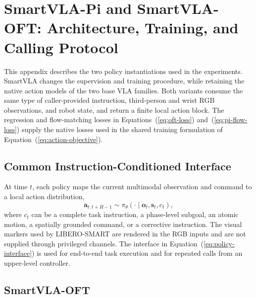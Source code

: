 \section{SmartVLA-Pi and SmartVLA-OFT: Architecture, Training, and Calling Protocol}
\label{appendix:model-details}

This appendix describes the two policy instantiations used in the
experiments. SmartVLA changes the supervision and training procedure,
while retaining the native action models of the two base VLA families.
Both variants consume the same type of caller-provided instruction,
third-person and wrist RGB observations, and robot state, and return a
finite local action block. The regression and flow-matching losses in
Equations~(\ref{eq:oft-loss}) and~(\ref{eq:pi-flow-loss}) supply the native
losses used in the shared training formulation of Equation~(\ref{eq:action-objective}).

\subsection{Common Instruction-Conditioned Interface}

At time $t$, each policy maps the current multimodal observation and
command to a local action distribution,
\begin{equation}
\label{eq:policy-interface}
\mathbf{a}_{t:t+H-1} \sim \pi_\theta(\cdot \mid
  \mathbf{o}_t,\mathbf{s}_t,c_t),
\end{equation}
where $c_t$ can be a complete task instruction, a phase-level
subgoal, an atomic motion, a spatially grounded command, or a corrective
instruction. The visual markers used by LIBERO-SMART are rendered in the
RGB inputs and are not supplied through privileged channels. The interface in
Equation~(\ref{eq:policy-interface}) is used for end-to-end task execution and for repeated calls
from an upper-level controller.

\subsection{SmartVLA-OFT}
\label{app:smartvla-oft}

